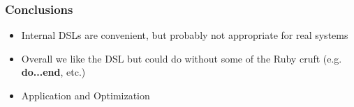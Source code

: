 \documentclass[t, xcolor=dvipsnames, handout, 10pt]{beamer}
\begin{document}
\begin{frame}[t]
\frametitle{Conclusions}
\pause
\begin{itemize}
\item Internal DSLs are convenient, but probably not appropriate for real systems
\pause
\item Overall we like the DSL but could do without some of the Ruby cruft (e.g. \textbf{do...end}, etc.)
\pause
\item Application and Optimization
\end{itemize}
\pause
\end{frame}
\end{document}
